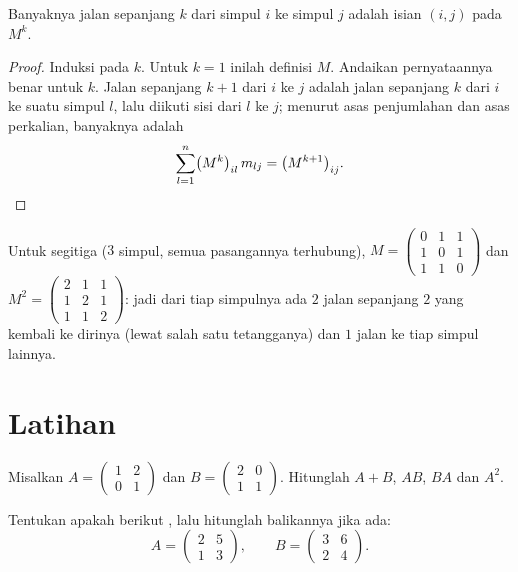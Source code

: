 \begin{theorem}\label{thm:g12:matrix:walks}
Banyaknya jalan sepanjang $k$ dari simpul $i$ ke simpul $j$ adalah
isian $(i,j)$ pada $M^k$.
\end{theorem}

\begin{proof}
Induksi pada $k$. Untuk $k = 1$ inilah definisi $M$. Andaikan
pernyataannya benar untuk $k$. Jalan sepanjang $k+1$ dari $i$ ke $j$ adalah jalan
sepanjang $k$ dari $i$ ke suatu simpul $l$, lalu diikuti sisi dari $l$ ke $j$; menurut
asas penjumlahan dan asas perkalian, banyaknya adalah
\[
\sum_{l=1}^{n} \bigl(M^k\bigr)_{il}\, m_{lj} = \bigl(M^{k+1}\bigr)_{ij}.
\qedhere
\]
\end{proof}

\begin{example}
Untuk  segitiga ($3$ simpul, semua pasangannya terhubung),
$M = \begin{pmatrix} 0&1&1\\ 1&0&1\\ 1&1&0\end{pmatrix}$ dan
$M^2 = \begin{pmatrix} 2&1&1\\ 1&2&1\\ 1&1&2\end{pmatrix}$: jadi dari tiap simpulnya
ada $2$ jalan sepanjang $2$ yang kembali ke dirinya (lewat salah satu tetangganya) dan
$1$ jalan ke tiap simpul lainnya.
\end{example}

\section{Latihan}

\begin{exercise}[$\star$]\label{exo:g12:matrix:1}
Misalkan $A = \begin{pmatrix} 1 & 2\\ 0 & 1 \end{pmatrix}$ dan
$B = \begin{pmatrix} 2 & 0\\ 1 & 1 \end{pmatrix}$. Hitunglah $A + B$, $AB$,
$BA$ dan $A^2$.
\end{exercise}

\begin{exercise}[$\star$]\label{exo:g12:matrix:2}
Tentukan apakah  berikut , lalu hitunglah
balikannya jika ada:
\[
A = \begin{pmatrix} 2 & 5\\ 1 & 3\end{pmatrix}, \qquad
B = \begin{pmatrix} 3 & 6\\ 2 & 4\end{pmatrix}.
\]
\end{exercise}


